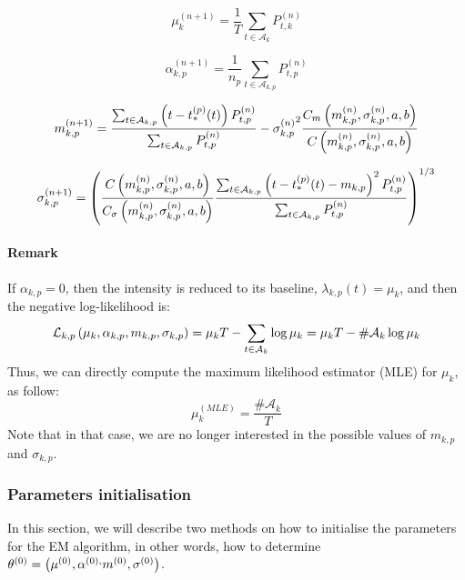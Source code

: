 \begin{equation}
    \mu_k^{(n+1)} = \frac{1}{T} \sum_{t\in\mathcal{A}_k} P_{t,k}^{(n)}
\end{equation}

\begin{equation}
    \alpha_{k,p}^{(n+1)} = \frac{1}{n_p} \sum_{t\in\mathcal{A}_{k,p}} P_{t,p}^{(n)}
\end{equation}

\begin{equation}
    m_{k,p}^{(n+1)} = \frac{\sum_{t\in\mathcal{A}_{k,p}} \left( t - t_*^{(p)}(t) \right) P_{t,p}^{(n)}}{\sum_{t\in\mathcal{A}_{k,p}} P_{t,p}^{(n)}} - {\sigma_{k,p}^{(n)}}^2 \frac{C_m\left( m_{k,p}^{(n)}, \sigma_{k,p}^{(n)},a,b \right)}{C\left( m_{k,p}^{(n)}, \sigma_{k,p}^{(n)},a,b \right)}
\end{equation}

\begin{equation}
    \sigma_{k,p}^{(n+1)} = \left( \frac{C\left( m_{k,p}^{(n)}, \sigma_{k,p}^{(n)},a,b \right)}{C_\sigma\left( m_{k,p}^{(n)}, \sigma_{k,p}^{(n)},a,b \right)} \frac{\sum_{t\in\mathcal{A}_{k,p}} \left( t - t_*^{(p)}(t) - m_{k,p} \right)^2 P_{t,p}^{(n)}}{\sum_{t\in\mathcal{A}_{k,p}}  P_{t,p}^{(n)}} \right)^{1/3}
\end{equation}

\paragraph{Remark} If $\alpha_{k,p} = 0$, then the intensity is reduced to its baseline, $\lambda_{k,p}(t) = \mu_k$, and then the negative log-likelihood is:
\begin{equation}
    \mathcal{L}_{k,p}\left( \mu_k, \alpha_{k,p}, m_{k,p}, \sigma_{k,p} \right) = \mu_k T -\sum_{t\in\mathcal{A}_k} \log \mu_k = \mu_k T - \#\mathcal{A}_k \log \mu_k
\end{equation}
Thus, we can directly compute the maximum likelihood estimator (MLE) for $\mu_k$, as follow:
\begin{equation}
    \mu_k^{(MLE)} = \frac{\#\mathcal{A}_k}{T}
\end{equation}
Note that in that case, we are no longer interested in the possible values of $m_{k,p}$ and $\sigma_{k,p}$.

\subsubsection{Parameters initialisation}\label{parameters_initialisation}

In this section, we will describe two methods on how to initialise the parameters for the EM algorithm, in other words, how to determine $\theta^{(0)} = \left( \mu^{(0)}, \alpha^{(0), }m^{(0)}, \sigma^{(0)} \right)$.
